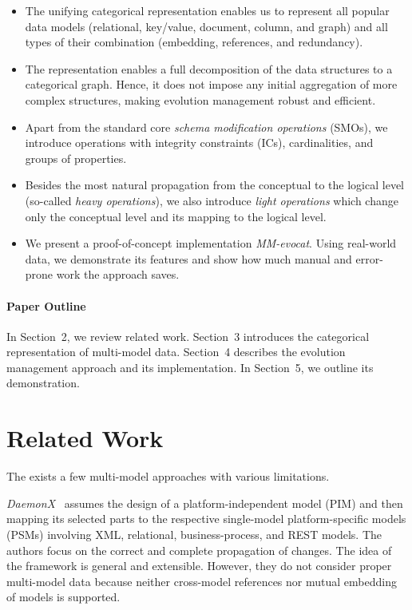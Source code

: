 \begin{itemize}
    \item The unifying categorical representation enables us to represent all popular data models (relational,  key/value, document, column, and graph) and all types of their combination (embedding, references, and redundancy).
    \item The representation enables a full decomposition of the data structures to a categorical graph. Hence, it does not impose any initial aggregation of more complex structures, making evolution management robust and efficient.
    \item Apart from the standard core \textit{schema modification operations} (SMOs), we introduce operations with integrity constraints (ICs), cardinalities, and groups of properties.
    \item Besides the most natural propagation from the conceptual to the logical level (so-called \textit{heavy operations}), we also introduce \textit{light operations} which change only the conceptual level and its mapping to the logical level.
    \item We present a proof-of-concept implementation \textit{MM-evocat}. Using real-world data, we demonstrate its features and show how much manual and error-prone work the approach saves.
\end{itemize}


\paragraph{Paper Outline} In Section~2, we review related work. Section~3 introduces the categorical representation of multi-model data. Section~4 describes the evolution management approach and its implementation. In Section~5, we outline its demonstration.

\section{Related Work}
The exists a few multi-model approaches with various limitations.

\textit{DaemonX}~\citep{10.1145/2539150.2539159} assumes the design of a platform-independent model (PIM) and then mapping its selected parts to the respective single-model platform-specific models (PSMs) involving XML, relational, business-process, and REST models. The authors focus on the correct and complete propagation of changes. The idea of the framework is general and extensible. However, they do not consider proper multi-model data because neither cross-model references nor mutual embedding of models is supported. 

